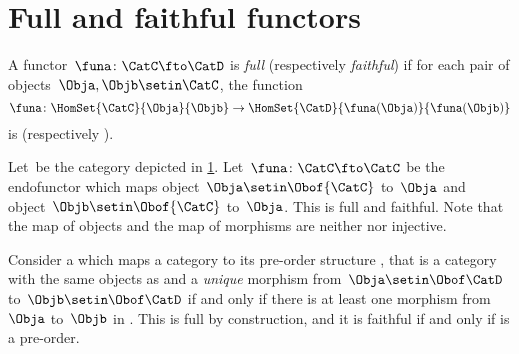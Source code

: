 
\section{Full and faithful functors}

\begin{ctdefinition}
    \label{def:functorfullfaith}
    A functor~$\funa\colon \CatC \fto \CatD$ is \emph{full} (respectively \emph{faithful}) if for each pair of objects~$\Obja,\Objb\setin \CatC$, the function
    \begin{equation}
        \funa \colon \HomSet{\CatC}{\Obja}{\Objb} \to \HomSet{\CatD}{\funa(\Obja)}{\funa(\Objb)}
    \end{equation}
    is  (respectively ).
\end{ctdefinition}

\begin{example}
    Let~\CatC be the category depicted in \cref{fig:ex_full_faithful_1}.
    Let~$\funa\colon \CatC \fto \CatC$ be the endofunctor which maps object~$\Obja\setin \Obof{\CatC}$ to~$\Obja$ and object~$\Objb\setin \Obof{\CatC}$ to~$\Obja$.
    This  is full and faithful.
    Note that the map of objects and the map of morphisms are neither  nor injective.

    \begin{figure}[h!]
        \centering
        \caption{}
        \label{fig:ex_full_faithful_1}
    \end{figure}
\end{example}

\begin{example}
    Consider a  which maps a category \CatC to its pre-order structure \CatD, that is a category with the same objects as \CatC and a \emph{unique} morphism from~$\Obja\setin \Obof\CatD$ to~$\Objb\setin \Obof\CatD$ if and only if there is at least one morphism from~$\Obja$ to~$\Objb$ in \CatC.
    This  is full by construction, and it is faithful if and only if \CatC is a pre-order.
\end{example}

